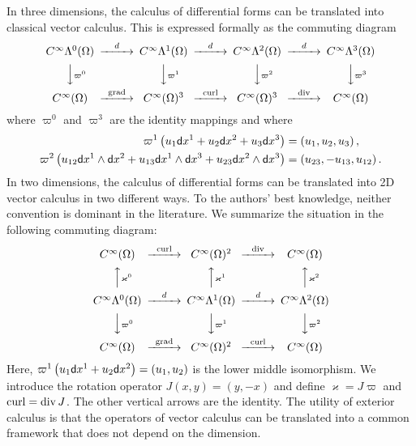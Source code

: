\documentclass[a4paper]{article}
\begin{document}
\begin{remark}
    In three dimensions, 
    the calculus of differential forms can be translated into classical vector calculus. 
    This is expressed formally as the commuting diagram 
    \[
    \begin{CD}
        C^\infty\Alt^0(\Omega) @>{d}>> C^\infty\Alt^1(\Omega) @>{d}>> C^\infty\Alt^2(\Omega) @>{d}>> C^\infty\Alt^3(\Omega) 
        \\
        @VV{\varpi^{0}}V 
        @VV{\varpi^{1}}V 
        @VV{\varpi^{2}}V 
        @VV{\varpi^{3}}V 
        \\
        C^\infty(\Omega) @>{\grad}>> C^\infty(\Omega)^{3} @>{\curl}>> C^\infty(\Omega)^{3} @>{\divergence}>> C^\infty(\Omega)
    \end{CD}
    \]
    where $\varpi^{0}$ and $\varpi^{3}$ are the identity mappings and where 
    \begin{align*}
     \varpi^{1}\left( u_1 {\mathsf d}x^{1} + u_2 {\mathsf d}x^{2} + u_3 {\mathsf d}x^{3} \right) 
     &= 
     \left( u_1, u_2, u_3 \right), 
     \\
     \varpi^{2}\left( u_{12} {\mathsf d}x^{1} \wedge {\mathsf d}x^{2} + u_{13} {\mathsf d}x^{1} \wedge {\mathsf d}x^{3} + u_{23} {\mathsf d}x^{2} \wedge {\mathsf d}x^{3} \right) 
     &= 
     \left( u_{23}, - u_{13}, u_{12} \right).   
    \end{align*}
    In two dimensions, 
    the calculus of differential forms can be translated into 2D vector calculus in two different ways. 
    To the authors' best knowledge, neither convention is dominant in the literature.
    We summarize the situation in the following commuting diagram: 
    \[
    \begin{CD}
        C^\infty(\Omega) @>{\curl}>> C^\infty(\Omega)^{2} @>{\divergence}>> C^\infty(\Omega)
        \\
        @AA{\varkappa^{0}}A 
        @AA{\varkappa^{1}}A 
        @AA{\varkappa^{2}}A 
        \\
        C^\infty\Alt^0(\Omega) @>{d}>> C^\infty\Alt^1(\Omega) @>{d}>> C^\infty\Alt^2(\Omega) 
        \\
        @VV{\varpi^{0}}V 
        @VV{\varpi^{1}}V 
        @VV{\varpi^{2}}V 
        \\
        C^\infty(\Omega) @>{\grad}>> C^\infty(\Omega)^{2} @>{\rot}>> C^\infty(\Omega)
    \end{CD}
    \]
    Here, $\varpi^{1}\left( u_1 {\mathsf d}x^{1} + u_2 {\mathsf d}x^{2} \right) = \left( u_1, u_2 \right)$ is the lower middle isomorphism. We introduce the rotation operator $J(x,y) = (y,-x)$ and define $\varkappa = J \varpi$ and $\operatorname{curl} = \operatorname{div} J$.
    The other vertical arrows are the identity. 
    The utility of exterior calculus is that the operators of vector calculus can be translated into a common framework that does not depend on the dimension.
\end{remark}
\end{document}
